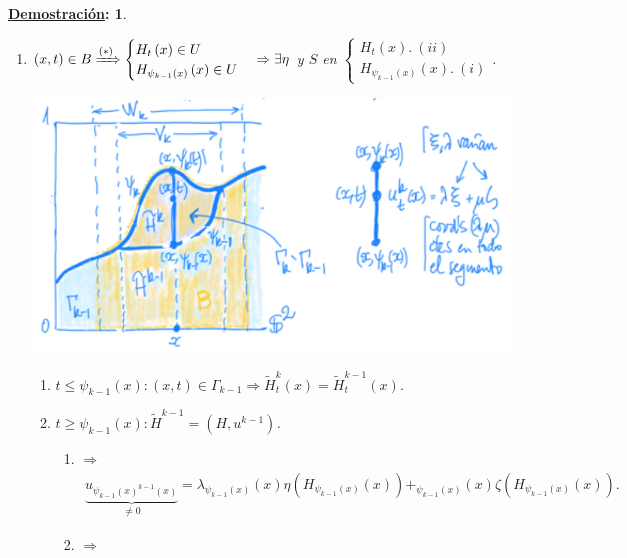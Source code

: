 \documentclass[10pt,a4paper,openright]{book}
\theoremstyle{break}
\newtheorem*{demo}{\underline{Demostración}:}
\begin{document}
\begin{demo}
\begin{enumerate}
    \item $\left( x, t \right) \in B \xRightarrow{(*)} \begin{cases}
        H_t\left( x \right) \in U\\
        H_{\psi_{k - 1} \left( x \right)} \left( x \right) \in U
    \end{cases} \Rightarrow \exists \eta$ y $S$ en $\begin{cases}
        H_t\left( x \right).\ (ii)\\
        H_{\psi_{k - 1} \left( x \right)} \left( x \right).\ (i)
    \end{cases}$.
    \begin{center}
        \includegraphics[scale=0.3]{images/finale_5} 
    \end{center}
    \begin{enumerate}
        \item $t \le \psi_{k - 1} \left( x \right) : \left( x, t \right) \in \Gamma_{k - 1} \Rightarrow \tilde{H}_t^k \left( x \right) = \tilde{H}_t^{k - 1} \left( x \right)$.
        \item $t \ge \psi_{k - 1} \left( x \right) : \tilde{H}^{k - 1} = \left( H, u^{k - 1} \right)$.
        \begin{enumerate}
            \item[(i)] $\Rightarrow$
            \begin{align*}
            \underbrace{u_{\psi_{k-1} \left( x \right)^{k - 1} \left( x \right)}}_{\neq 0} = \lambda_{\psi_{k - 1} \left( x \right)} \left( x \right) \eta\left( H_{\psi_{k - 1}\left( x \right)} \left( x \right) \right) + _{\psi_{k - 1} \left( x \right)} \left( x \right) \zeta\left( H_{\psi_{k - 1}\left( x \right)} \left( x \right) \right) 
            .\end{align*}
            \item[(ii)] $\Rightarrow$

\end{enumerate}
\end{enumerate}
\end{enumerate}
\end{demo}
\end{document}
